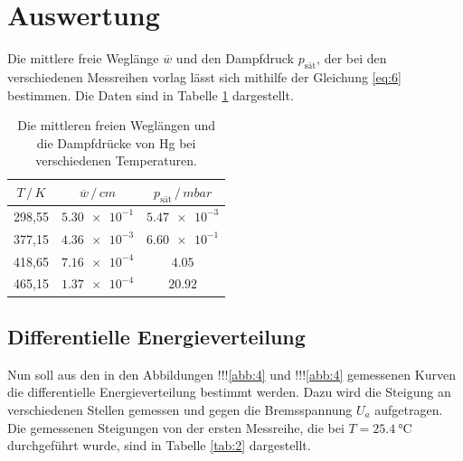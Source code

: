 \section{Auswertung}

Die mittlere freie Weglänge $\overline{w}$ und den Dampfdruck $p_\text{sät}$, der bei den verschiedenen
Messreihen vorlag lässt sich mithilfe der Gleichung \ref{eq:6} bestimmen. Die Daten
sind in Tabelle \ref{tab:1} dargestellt.

\begin{table}
  \centering
  \caption{Die mittleren freien Weglängen und die Dampfdrücke von Hg bei verschiedenen
  Temperaturen.}
  \label{tab:1}
  \begin{tabular}{c c c}
    \toprule
    $T \, / \, K$ & $\overline{w} \, / \, cm$ & $p_\text{sät} \, / \, mbar$ \\
    \midrule
    298,55 & $\num{5.30e-1}$ & $\num{5.47e-3}$ \\
    377,15 & $\num{4.36e-3}$ & $\num{6.60e-1}$ \\
    418,65 & $\num{7.16e-4}$ & $\num{4.05}$    \\
    465,15 & $\num{1.37e-4}$ & $\num{20.92}$ \\
    \bottomrule
  \end{tabular}
\end{table}

\subsection{Differentielle Energieverteilung}

Nun soll aus den in den Abbildungen !!!\ref{abb:4} und !!!\ref{abb:4} gemessenen Kurven
die differentielle Energieverteilung bestimmt werden. Dazu wird die Steigung
an verschiedenen Stellen gemessen und gegen die Bremsspannung $U_a$ aufgetragen.
Die gemessenen Steigungen von der ersten Messreihe, die bei $T = \SI{25.4}{\celsius}$
durchgeführt wurde, sind in Tabelle \ref{tab:2} dargestellt.

